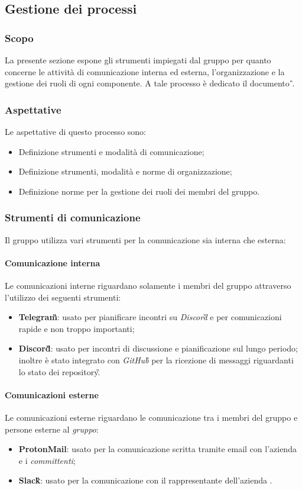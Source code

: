 \subsection{Gestione dei processi} %
\subsubsection{Scopo}
La presente sezione espone gli strumenti impiegati dal gruppo \teamname{} per quanto concerne le attività di comunicazione interna ed esterna, l'organizzazione e la gestione dei ruoli di ogni componente.
A tale processo è dedicato il documento \PdP{}\textit{\G}.

\subsubsection{Aspettative}
Le aspettative di questo processo sono:
\begin{itemize}
	\item Definizione strumenti e modalità di comunicazione;
	\item Definizione strumenti, modalità e norme di organizzazione;
	\item Definizione norme per la gestione dei ruoli dei membri del gruppo.
\end{itemize}

\subsubsection{Strumenti di comunicazione}
Il gruppo \teamname{} utilizza vari strumenti per la comunicazione sia interna che esterna:
	\paragraph{Comunicazione interna}
		Le comunicazioni interne riguardano solamente i membri del gruppo \teamname{} attraverso l'utilizzo dei seguenti strumenti:
			\begin{itemize}
				\item \textbf{Telegram\G}: usato per pianificare incontri su \emph{Discord}\G{} e per comunicazioni rapide e non troppo importanti;
				\item \textbf{Discord\G}: usato per incontri di discussione e pianificazione sul lungo periodo; inoltre è stato integrato con \emph{GitHub\G{}} per la ricezione di messaggi riguardanti lo stato dei repository\G.
			\end{itemize}
	\paragraph{Comunicazioni esterne}
	\label{sec:Comunicazioni esterne}
		Le comunicazioni esterne riguardano le comunicazione tra i membri del gruppo \teamname e persone esterne al \emph{gruppo}:
			\begin{itemize}
				\item \textbf{ProtonMail}: usato per la comunicazione scritta tramite email con l'azienda \proponente e i \emph{committenti};
				\item \textbf{Slack\G}: usato per la comunicazione con il rappresentante dell'azienda \proponente.
			\end{itemize}
		
